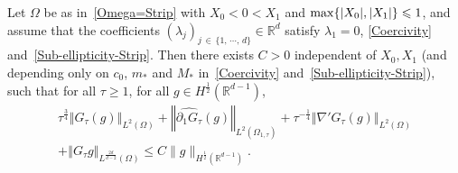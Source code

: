 \documentclass[AHL,Unicode,longabstracts]{cedram}
\newcommand*\R{\mathbb{R}}
\newcommand{\norm}[1]{\left\Vert#1\right\Vert}
\renewcommand{\leq}{\leqslant}
\renewcommand{\geq}{\geqslant}
\begin{document}
\begin{prop}\label{Prop-OpNorm-Est-G-tau}
Let $\Omega$ be as in~\eqref{Omega=Strip} with $X_0 \! <\! 0\! <\! X_1$ and $\max\{ |X_0|, |X_1|\}\linebreak \leq 1$, and assume that the coefficients $(\lambda_j)_{j\, \in\,\{1,\,\cdots,\,d\}} \in \R^d$ satisfy $\lambda_1 = 0$, \eqref{Coercivity} and~\eqref{Sub-ellipticity-Strip}. Then there exists $C>0$ independent of $X_0, X_1$ (and depending only on $c_0$, $m_*$ and $M_*$ in~\eqref{Coercivity} and~\eqref{Sub-ellipticity-Strip}), such that for all $\tau \geq 1$, for all $g \in H^{\frac{1}{2}}(\R^{d-1})$,
\begin{multline}\label{Est-G-tau-g-H-1/2-L-2_*}
\tau^{\frac{3}{4}} \norm{G_{\tau} (g)}_{L^2(\Omega)} +
\norm{\widehat{\partial_1 G_\tau} (g)}_{L^2(\Omega_{1, \tau})} 
+
\tau^{-\frac{1}{4}} \norm{\nabla' G_\tau (g)}_{L^2(\Omega)}\\
+
\norm{G_{\tau} g}_{L^{\frac{2d}{d-2}}(\Omega)}
\leq C \| g \|_{H^{\frac{1}{2}}\left(\R^{d-1}\right)}.
\end{multline}
\end{prop}
\end{document}
